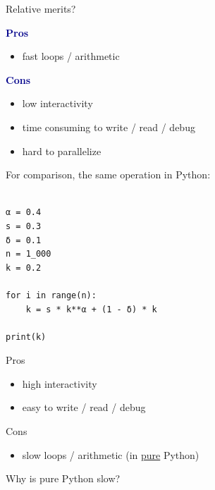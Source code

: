 \documentclass[
    xcolor={svgnames,dvipsnames},
    hyperref={colorlinks, citecolor=DeepPink4, linkcolor=DarkRed, urlcolor=DarkBlue}
    ]{beamer}  %
\newcommand{\navy}[1]{\textcolor{DarkBlue}{\bf #1}}
\newcommand{\1}{\mathbbm 1}
\begin{document}
\begin{frame}

    Relative merits?

    \vspace{0.5em}
    \vspace{0.5em}
    \navy{Pros}

    \begin{itemize}
        \item fast loops / arithmetic
    \end{itemize}


    \vspace{0.5em}

    \navy{Cons}

    \begin{itemize}
        \item low interactivity
        \item time consuming to write / read / debug
        \item hard to parallelize
    \end{itemize}

\end{frame}




\begin{frame}[fragile]

    For comparison, the same operation in Python:
    
    \begin{verbatim}

α = 0.4
s = 0.3
δ = 0.1
n = 1_000
k = 0.2

for i in range(n):
    k = s * k**α + (1 - δ) * k

print(k)

    \end{verbatim}

\end{frame}



\begin{frame}

    Pros

    \begin{itemize}
        \item high interactivity
        \item easy to write / read / debug
    \end{itemize}

    \vspace{0.5em}

    Cons

    \begin{itemize}
        \item slow loops / arithmetic  (in \underline{pure} Python)
    \end{itemize}

    \pause
    \vspace{0.5em}
    \vspace{0.5em}
    \vspace{0.5em}
    \vspace{0.5em}
    Why is pure Python slow?


\end{frame}
\end{document}
